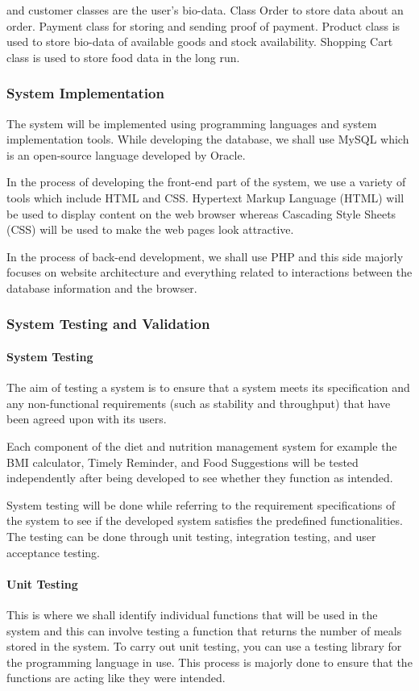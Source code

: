 \documentclass{article}
\begin{document}
and customer classes are the user’s bio-data. Class Order to store data about an order. Payment class for storing and sending proof of payment. Product class is used to store bio-data of available goods and stock availability. Shopping Cart class is used to store food data in the long run.

\subsubsection{System Implementation}
The system will be implemented using programming languages and system implementation tools. While developing the database, we shall use MySQL which is an open-source language developed by Oracle.  

In the process of developing the front-end part of the system, we use a variety of tools which include HTML and CSS.  Hypertext Markup Language (HTML) will be used to display content on the web browser whereas Cascading Style Sheets (CSS) will be used to make the web pages look attractive. 

In the process of back-end development, we shall use PHP and this side majorly focuses on website architecture and everything related to interactions between the database information and the browser. 

\subsubsection{System Testing and Validation}
\paragraph{System Testing \\}
The aim of testing a system is to ensure that a system meets its specification and any non-functional requirements (such as stability and throughput) that have been agreed upon with its users.

Each component of the diet and nutrition management system for example the BMI calculator, Timely Reminder, and Food Suggestions will be tested independently after being developed to see whether they function as intended.

System testing will be done while referring to the requirement specifications of the system to see if the developed system satisfies the predefined functionalities. The testing can be done through unit testing, integration testing, and user acceptance testing. 

\paragraph{Unit Testing \\}
This is where we shall identify individual functions that will be used in the system and this can involve testing a function that returns the number of meals stored in the system. To carry out unit testing, you can use a testing library for the programming language in use. This process is majorly done to ensure that the functions are acting like they were intended. 
\end{document}
